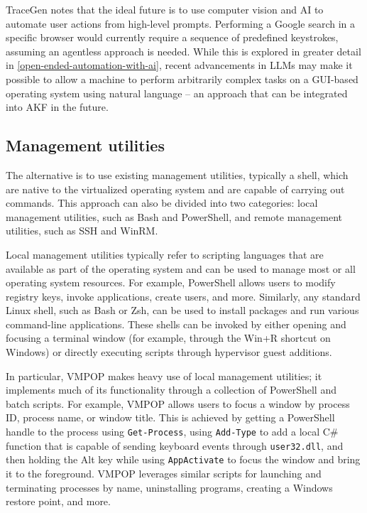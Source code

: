 \documentclass[letterpaper,12pt]{report}
\newcommand{\passthrough}[1]{#1}
\begin{document}
TraceGen \cite{duTraceGenUserActivity2021} notes that the ideal
future is to use computer vision and AI to automate user actions from
high-level prompts. Performing a Google search in a specific browser
would currently require a sequence of predefined keystrokes, assuming an
agentless approach is needed. While this is explored in greater detail
in \autoref{open-ended-automation-with-ai},
recent advancements in LLMs may make it possible to allow a machine to
perform arbitrarily complex tasks on a GUI-based operating system using
natural language -- an approach that can be integrated into AKF in the
future.

\subsection{Management utilities}\label{management-utilities}

The alternative is to use existing management utilities, typically a
shell, which are native to the virtualized operating system and are
capable of carrying out commands. This approach can also be divided into
two categories: local management utilities, such as Bash and PowerShell,
and remote management utilities, such as SSH and WinRM.

Local management utilities typically refer to scripting languages that
are available as part of the operating system and can be used to manage
most or all operating system resources. For example, PowerShell allows
users to modify registry keys, invoke applications, create users, and
more. Similarly, any standard Linux shell, such as Bash or Zsh, can be
used to install packages and run various command-line applications.
These shells can be invoked by either opening and focusing a terminal
window (for example, through the Win+R shortcut on Windows) or directly
executing scripts through hypervisor guest additions.

In particular, VMPOP \cite{parkTREDEVMPOPCultivating2018} makes
heavy use of local management utilities; it implements much of its
functionality through a collection of PowerShell and batch scripts. For
example, VMPOP allows users to focus a window by process ID, process
name, or window title. This is achieved by getting a PowerShell handle
to the process using \passthrough{\lstinline!Get-Process!}, using
\passthrough{\lstinline!Add-Type!} to add a local C\# function that is
capable of sending keyboard events through
\passthrough{\lstinline!user32.dll!}, and then holding the Alt key while
using \passthrough{\lstinline!AppActivate!} to focus the window and
bring it to the foreground. VMPOP leverages similar scripts for
launching and terminating processes by name, uninstalling programs,
creating a Windows restore point, and more.
\end{document}
